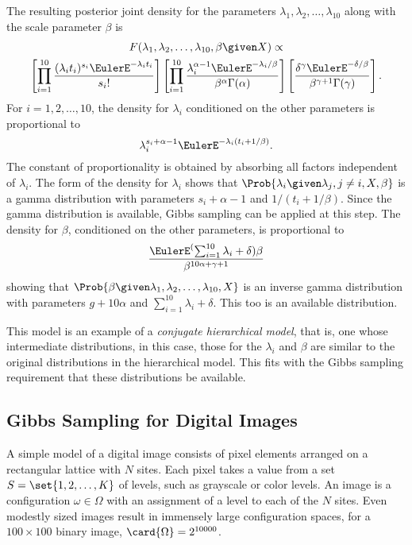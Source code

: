 \documentclass[12pt]{article}
\begin{document}
The resulting posterior joint density for the parameters \( \lambda_1,
\lambda_2, \dots, \lambda_{10} \) along with the scale parameter \(
\beta \) is
\begin{multline*}
    F(\lambda_1, \lambda_2, \dots, \lambda_{10}, \beta \given X)
    \propto \\
    \left[ \prod_{i=1}^{10} \frac{(\lambda_i t_i)^{s_i} \EulerE^{-\lambda_i
    t_i}}{s_i!} \right] \left[ \prod_{i=1}^{10} \frac{\lambda_i^{\alpha-1}
    \EulerE^{-\lambda_i/\beta}}{\beta^{\alpha} \Gamma(\alpha)} \right]
    \left[ \frac{\delta^{\gamma} \EulerE^{-\delta/\beta}}{\beta^{\gamma+1}
    \Gamma(\gamma)} \right].
\end{multline*} For \( i = 1,2, \dots, 10 \), the density for \( \lambda_i \)
conditioned on the other parameters is proportional to
\[
    \lambda_i^{s_i + \alpha -1} \EulerE^{-\lambda_i (t_i+1/\beta)}.
\] The constant of proportionality is obtained by absorbing all factors
independent of \( \lambda_i \).  The form of the density for \( \lambda_i
\) shows that \( \Prob{\lambda_i \given \lambda_j, j \ne i, X, \beta} \)
is a gamma distribution with parameters \( s_i + \alpha -1 \) and \( 1/(t_i
+ 1/\beta) \).  Since the gamma distribution is available, Gibbs
sampling can be applied at this step.  The density for \( \beta \),
conditioned on the other parameters, is proportional to
\[
    \frac{\EulerE^({\sum_{i=1}^{10}\lambda_i + \delta})\beta}{\beta^{10\alpha+\gamma+1}}
\] showing that \( \Prob{\beta \given \lambda_1, \lambda_2, \dots,
\lambda_{10}, X} \) is an inverse gamma distribution with parameters \(
g + 10 \alpha \) and \( \sum\limits_{i=1}^{10} \lambda_i+\delta \).
This too is an available distribution.

This model is an example of a \emph{conjugate hierarchical model}, that
is, one whose intermediate distributions, in this case, those for the \(
\lambda_i \) and \( \beta \) are similar to the original distributions
in the hierarchical model.  This fits with the Gibbs sampling
requirement that these distributions be available.

\subsection*{Gibbs Sampling for Digital Images}

A simple model of a digital image consists of pixel elements arranged on
a rectangular lattice with \( N \) sites.  Each pixel takes a value from
a set \( S = \set{1,2, \dots, K} \) of levels, such as grayscale or
color levels.  An image is a configuration \( \omega \in \Omega \) with
an assignment of a level to each of the \( N \) sites.  Even modestly
sized images result in immensely large configuration spaces, for a \(
100 \times 100 \) binary image, \( \card{\Omega} = 2^{10000} \).
\end{document}
